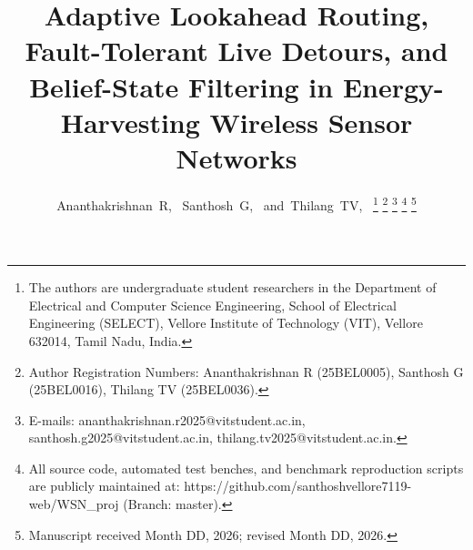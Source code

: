 \documentclass[journal]{IEEEtran}
\begin{document}
\title{Adaptive Lookahead Routing, Fault-Tolerant Live Detours, and Belief-State Filtering in Energy-Harvesting Wireless Sensor Networks}

\author{Ananthakrishnan~R,~
        Santhosh~G,~
        and~Thilang~TV,~%
\thanks{The authors are undergraduate student researchers in the Department of Electrical and Computer Science Engineering, School of Electrical Engineering (SELECT), Vellore Institute of Technology (VIT), Vellore 632014, Tamil Nadu, India.}%
\thanks{Author Registration Numbers: Ananthakrishnan R (25BEL0005), Santhosh G (25BEL0016), Thilang TV (25BEL0036).}%
\thanks{E-mails: ananthakrishnan.r2025@vitstudent.ac.in, santhosh.g2025@vitstudent.ac.in, thilang.tv2025@vitstudent.ac.in.}%
\thanks{All source code, automated test benches, and benchmark reproduction scripts are publicly maintained at: https://github.com/santhoshvellore7119-web/WSN\_proj (Branch: master).}%
\thanks{Manuscript received Month DD, 2026; revised Month DD, 2026.}}

\maketitle
\end{document}
